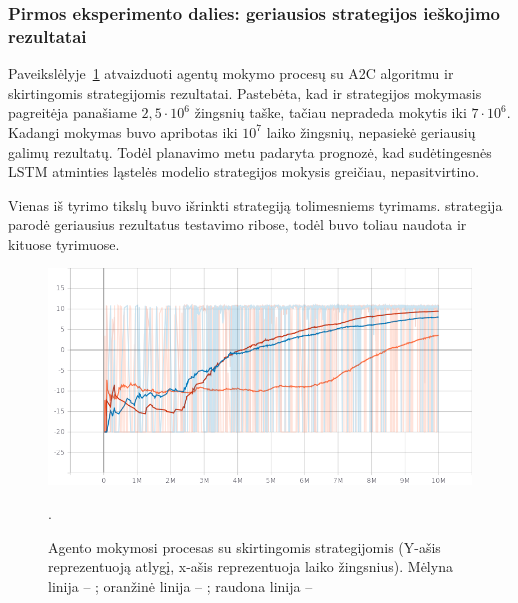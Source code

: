 \documentclass{VUMIFPSbakalaurinis}
\begin{document}
\subsubsection{Pirmos eksperimento dalies: geriausios strategijos ieškojimo rezultatai}
{
	Paveikslėlyje~\ref{img:policies_graph} atvaizduoti agentų mokymo procesų su A2C algoritmu ir skirtingomis strategijomis rezultatai. Pastebėta, kad  ir  strategijos mokymasis pagreitėja panašiame \(2,5\cdot10^6\) žingsnių taške, tačiau  nepradeda mokytis iki \(7\cdot10^6\). Kadangi mokymas buvo apribotas iki \(10^7\) laiko žingsnių,  nepasiekė geriausių galimų rezultatų. Todėl planavimo metu padaryta prognozė, kad sudėtingesnės LSTM atminties ląstelės modelio strategijos mokysis greičiau, nepasitvirtino.\par
	
	Vienas iš tyrimo tikslų buvo išrinkti strategiją tolimesniems tyrimams.  strategija parodė geriausius rezultatus testavimo ribose, todėl buvo toliau naudota ir kituose tyrimuose.
	
	\begin{figure}[H]
		\centering
		\includegraphics[scale=0.5]{img/graphs/policies}
		\caption{Agento mokymosi procesas su skirtingomis strategijomis (Y-ašis reprezentuoją atlygį, x-ašis reprezentuoja laiko žingsnius). Mėlyna linija -- ; oranžinė linija -- ; raudona linija -- }.
		\label{img:policies_graph}
	\end{figure}
}
\end{document}
